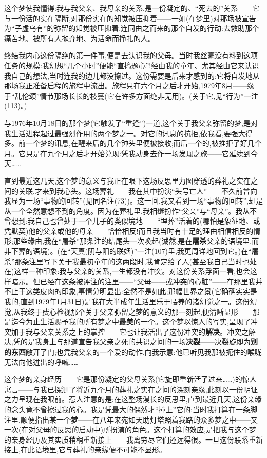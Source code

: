 这个梦使我懂得:我与我父亲、我母亲的关系,是一份凝定的、“死去的”关系——它与一份活的实在隔断,对那份实在的知觉被压抑着——一如(在梦里)对那场被宣告为“子虚乌有”的弥留的知觉被压抑着,连同由之而来的那个自发的行动:去救助那个痛苦地、被所有人抛弃地、为活命而挣扎的人。

\dmark{}终结我内心这份隔绝的第一件事,便是去认识我的父母。当时我丝毫没有料到这项任务的规模:我幻想“几个小时”便能“直捣题心”!经由我的童年、尤其经由它来认识我自己的想法,当时连我的边儿都没擦过。这份需要是后来才感到的:它将自发地从那场我正准备启程的旅程中流出。旅程只在六个月之后才开始,1979年8月——缘于“乱伦颂”情节那场长长的枝蔓(它在许多方面绝非无用)。(关于它,见“行为”一注(113)。)

与1976年10月18日的那个梦(它触发了“重逢”)一道,这个关于我父亲弥留的梦,是对我生活进程起过最强烈作用的两个梦之一。对它的讯息的抗拒,依我看,要强大得多。前一个梦的讯息,在醒来后的几个钟头里便被接收;而后一个的,被推拒了好几个月。它只是在九个月之后才开始兑现:凭我动身去作一场发现之旅——它延续到今天……

直到最近这几天,这个梦的意义与我正在眼下这场反思里力图穿透的葬礼之实在之间的关联,才来到我心头。这场葬礼——我在其中扮演“头号亡人”——不久前曾向我显为一场“事物的回转”(见同名注(73))。这一回,我又看到一场“事物的回转”,却是从一个全然意想不到的角度。因为在葬礼里,我相继扮作“父亲”与“母亲”。我从不曾想到:我自己也曾处于一个儿子的类似境地——“埋葬”活着的(哪怕是象征地、或凭默契)他的父亲或他的母亲——恰恰相反!而且我当时有十足的理由相信相反的情形;那些缘由,我在“屠杀”那条注的结尾头一次唤起(诚然,是在\textbf{屠杀}父亲的语境里,而非下葬的语境)。(在“天真(阴与阳的联姻)”一注(107)里,我更周详地回到它。)在“屠杀”那条注里写下关于我最初童年的这两段时,我肯定给了人(甚至我自己当时也处在)这样一种印象:我与父亲的关系,一生都没有冲突。对这份关系浮面一看,也会这样暗示。但已经在这条被评注的注里——“父母——或冲突的心脏”——在那里我并不止于这类皮肉的印象,事情分明显出\dmark{}:全然不是如此;那幅世界之景(它确确实实是我的,直到1979年1月31日)是我在大半成年生活里乐于喂养的诸幻觉之一。这份幻觉,从我终于费心检视那个关于父亲弥留之梦的意义的那一刻起,便清晰显形——那是迄今为止生活赐予我的所有梦之中最\textbf{美}的一个。这个梦以惊人的写实,呈现了冲突加于我与父亲关系之上的掌控——它也让我活出了这份冲突的\textbf{解决}。冲突之解决,凭的是我身上与那道宣告我父亲之死的共识之间的一场\textbf{决裂}——决裂旋即为\textbf{别的东西}敞开了门;也凭我父亲的一个爱的动作,向我示意:他已听见我那被扼住的喉咙无法向他迸出的呼喊……

这个梦的亲身经历——它是那份凝定的父母关系(它旋即重新活了过来……)的惊人寓言——与我已探测了将近九个月的葬礼之实在之间的深刻亲缘,此刻以一份明证之力呈现在我眼前。惹人注意的是:在这整场漫长的反思里,直到最近几天,这份亲缘的念头竟不曾擦过我的心。我是凭最大的偶然才“撞上”它的:当时我打算在一条脚注里,顺便指出某一个\textbf{梦}——在八年来宛如天助灯塔照着我路的众多梦之中——又一次(在对父母的反思的启动中)所扮演的角色。这个打算的效应,是把我与这个梦的亲身经历及其实质稍稍重新接上——我离穷尽它们还远得很。一旦这份联系重新接上,在此语境里,它与葬礼的亲缘便不可能不显形。

